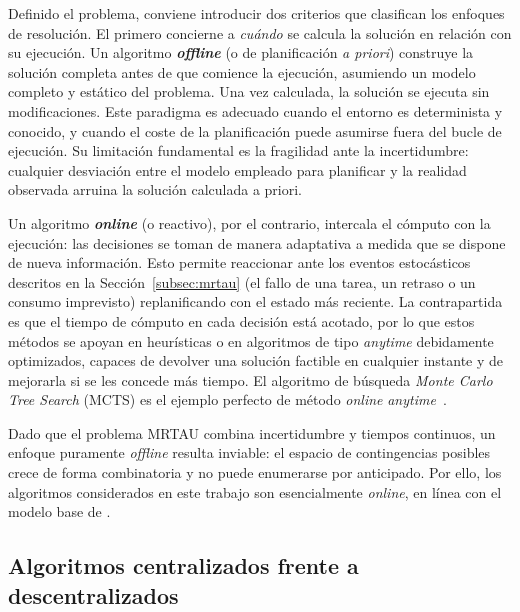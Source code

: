 Definido el problema, conviene introducir dos criterios que clasifican los enfoques de resolución. El primero concierne a \emph{cuándo} se calcula la solución en relación con su ejecución. Un algoritmo \textbf{\textit{offline}} (o de planificación \textit{a priori}) construye la solución completa antes de que comience la ejecución, asumiendo un modelo completo y estático del problema. Una vez calculada, la solución se ejecuta sin modificaciones. Este paradigma es adecuado cuando el entorno es determinista y conocido, y cuando el coste de la planificación puede asumirse fuera del bucle de ejecución. Su limitación fundamental es la fragilidad ante la incertidumbre: cualquier desviación entre el modelo empleado para planificar y la realidad observada arruina la solución calculada a priori.

Un algoritmo \textbf{\textit{online}} (o reactivo), por el contrario, intercala el cómputo con la ejecución: las decisiones se toman de manera adaptativa a medida que se dispone de nueva información. Esto permite reaccionar ante los eventos estocásticos descritos en la Sección~\ref{subsec:mrtau} (el fallo de una tarea, un retraso o un consumo imprevisto) replanificando con el estado más reciente. La contrapartida es que el tiempo de cómputo en cada decisión está acotado, por lo que estos métodos se apoyan en heurísticas o en algoritmos de tipo \textit{anytime} debidamente optimizados, capaces de devolver una solución factible en cualquier instante y de mejorarla si se les concede más tiempo. El algoritmo de búsqueda \textit{Monte Carlo Tree Search} (MCTS) es el ejemplo perfecto de método \textit{online} \textit{anytime}~\cite{browne2012survey}.

Dado que el problema MRTAU combina incertidumbre y tiempos continuos, un enfoque puramente \textit{offline} resulta inviable: el espacio de contingencias posibles crece de forma combinatoria y no puede enumerarse por anticipado. Por ello, los algoritmos considerados en este trabajo son esencialmente \textit{online}, en línea con el modelo base de .


\subsection{Algoritmos centralizados frente a descentralizados} \label{subsec:centralizado-descentralizado} %

